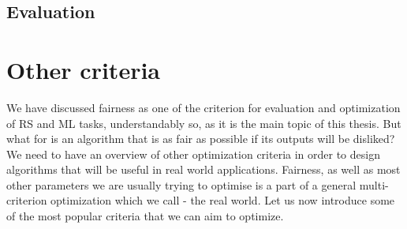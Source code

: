 \begin{itemize}
    
\end{itemize}

\subsection{Evaluation} \label{sec:02_evaluation}


\section{Other criteria} \label{sec:02_other_criteria}


We have discussed fairness as one of the criterion for evaluation and optimization of RS and ML tasks, understandably so, as it is the main topic of this thesis. But what for is an algorithm that is as fair as possible if its outputs will be disliked? We need to have an overview of other optimization criteria in order to design algorithms that will be useful in real world applications. Fairness, as well as most other parameters we are usually trying to optimise is a part of a general multi-criterion optimization which we call - the real world. Let us now introduce some of the most popular criteria that we can aim to optimize.


